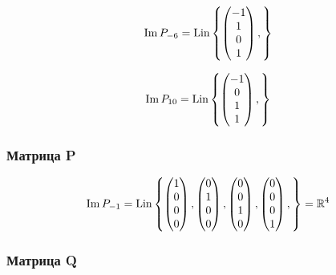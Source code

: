 \documentclass[12pt, a4paper]{article}
\begin{document}
    \begin{equation}
        \operatorname{Im} P_{-6}  = \operatorname{Lin} \left\{ 
        \begin{pmatrix} -1 \\ 1 \\ 0 \\ 1 \end{pmatrix},
        \right\}
    \end{equation}

    \begin{equation}
        \operatorname{Im} P_{10}  = \operatorname{Lin} \left\{ 
        \begin{pmatrix} -1 \\ 0 \\ 1 \\ 1 \end{pmatrix},
        \right\}
    \end{equation}


    
    \subsubsection{Матрица P}

    \begin{equation}
        \operatorname{Im} P_{-1}  = \operatorname{Lin} \left\{ 
            \begin{pmatrix} 1 \\ 0 \\ 0 \\ 0 \end{pmatrix},
            \begin{pmatrix} 0 \\ 1 \\ 0 \\ 0 \end{pmatrix},
            \begin{pmatrix} 0 \\ 0 \\ 1 \\ 0 \end{pmatrix},
            \begin{pmatrix} 0 \\ 0 \\ 0 \\ 1 \end{pmatrix},
        \right\} = {\mathbb{R}}^4
    \end{equation}
    

    \subsubsection{Матрица Q}
\end{document}
